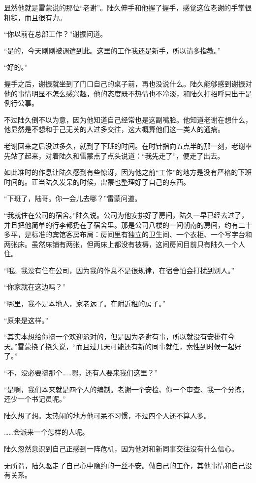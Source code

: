 显然他就是雷蒙说的那位“老谢”。陆久伸手和他握了握手，感觉这位老谢的手掌很粗糙，而且很有力。

“你以前在总部工作？”谢振问道。

“是的，今天刚刚被调遣到此。这里的工作我还是新手，所以请多指教。”

“好的。”

握手之后，谢振就坐到了门口自己的桌子前，再也没说什么。陆久能够感到谢振对他的事情明显不怎么感兴趣，他的态度既不热情也不冷淡，和陆久打招呼只出于是例行公事。

不过陆久倒不以为意，因为他知道自己经常也是这副嘴脸。他知道老谢在想什么，他显然是不想和于己无关的人过多交往，这大概算他们这一类人的通病。

老谢回来之后没过多久，就到了下班的时间。在时针指向五点半的那一刻，老谢率先站了起来，对着陆久和雷蒙点了点头说道：“我先走了”，便走了出去。

如此准时的作息让陆久感到有些惊讶，因为他之前“工作”的地方是没有严格的下班时间的。正当陆久发呆的时候，雷蒙也整理好了自己的东西。

“下班了，陆哥。你一会儿去哪？”雷蒙问道。

“我就住在公司的宿舍。”陆久说。公司为他安排好了房间，陆久一早已经去过了，并且把他简单的行李都扔在了宿舍里。那是公司八楼的一间朝南的房间，约有二十多平，是标准的宾馆客房布局：房间里有独立的卫生间、一个衣柜、一个写字台和两张床。虽然床铺有两张，但两床上都没有被褥，这间房间目前只有陆久一个人住。

“哦。我没有住在公司，因为我的作息不是很规律，在宿舍怕会打扰到别人。”

“你家就在这边吗？”

“哪里，我不是本地人，家老远了。在附近租的房子。”

“原来是这样。”

“其实本想给你搞一个欢迎派对的，但是因为老谢有事，所以就没有安排在今天。”雷蒙挠了挠头说，“而且过几天可能还有新的同事就任，索性到时候一起好了。”

“不，没必要搞那个……嗯，还有人要来我们这里？”

“是啊，我们本来就是四个人的编制。老谢一个安检、你一个审查、我一个分拣，还少一个书记员呢。”

陆久想了想。太热闹的地方他可呆不习惯，不过四个人还不算人多。

……会派来一个怎样的人呢。

陆久忽然意识到自己正感到一阵危机，因为他对和新同事交往没有什么信心。

无所谓，陆久驱走了自己心中隐约的一丝不安。做自己的工作，其他事情和自己没有关系。

